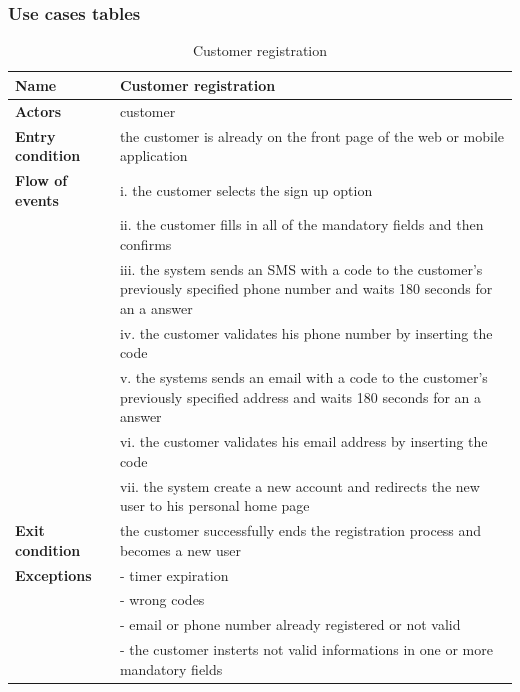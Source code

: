 \subsubsection{Use cases tables}

\begin{table}[h!]
    \centering
    \begin{tabular}{@{}P{0.2\textwidth}P{0.70\textwidth}@{}}
        \toprule
        \textbf{Name}                 & Customer registration\\
        \midrule
        \textbf{Actors}               & customer\\
        \textbf{Entry condition}      & the customer is already on the front page of the web or mobile application\\
        \textbf{Flow of events} 
        & i. the customer selects the sign up option\\
        & ii. the customer fills in all of the mandatory fields and then confirms\\
        & iii. the system sends an SMS with a code to the customer's previously specified phone number and waits 180 seconds for an a answer\\
        & iv. the customer validates his phone number by inserting the code\\
        & v. the systems sends an email with a code to the customer's previously specified address and waits 180 seconds for an a answer\\
        & vi. the customer validates his email address by inserting the code\\
        & vii. the system create a new account and redirects the new user to his personal home page\\
        \textbf{Exit condition}       & the customer successfully ends the registration process and becomes a new user\\
        \textbf{Exceptions}           
        & - timer expiration\\
        & - wrong codes\\
        & - email or phone number already registered or not valid\\
        & - the customer insterts not valid informations in one or more mandatory fields\\
        \bottomrule
    \end{tabular}
\caption{Customer registration}
\label{table:customerregitration}
\end{table}

